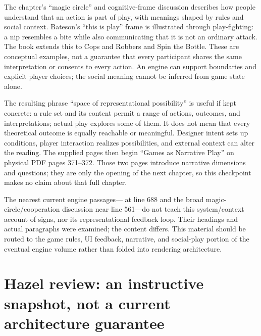 The chapter's ``magic circle'' and cognitive-frame discussion describes how people understand that an action is part of play, with meanings shaped by rules and social context. Bateson's ``this is play'' frame is illustrated through play-fighting: a nip resembles a bite while also communicating that it is not an ordinary attack. The book extends this to Cops and Robbers and Spin the Bottle. These are conceptual examples, not a guarantee that every participant shares the same interpretation or consents to every action. An engine can support boundaries and explicit player choices; the social meaning cannot be inferred from game state alone.

The resulting phrase ``space of representational possibility'' is useful if kept concrete: a rule set and its content permit a range of actions, outcomes, and interpretations; actual play explores some of them. It does not mean that every theoretical outcome is equally reachable or meaningful. Designer intent sets up conditions, player interaction realizes possibilities, and external context can alter the reading. The supplied pages then begin ``Games as Narrative Play'' on physical PDF pages 371--372. Those two pages introduce narrative dimensions and questions; they are only the opening of the next chapter, so this checkpoint makes no claim about that full chapter.

The nearest current engine passages--- at line 688 and the broad magic-circle/cooperation discussion near line 561---do not teach this system/context account of signs, nor its representational feedback loop. Their headings and actual paragraphs were examined; the content differs. This material should be routed to the game rules, UI feedback, narrative, and social-play portion of the eventual engine volume rather than folded into rendering architecture.

\section{Hazel review: an instructive snapshot, not a current architecture guarantee}\label{06-engine-ii-ch046-hazel-review-an-instructive-snapshot-not-a-current-architecture-guarantee}

\hypertarget{06-engine-ii-ch046-hazel-review-an-instructive-snapshot-not-a-current-architecture-guarantee}{}

